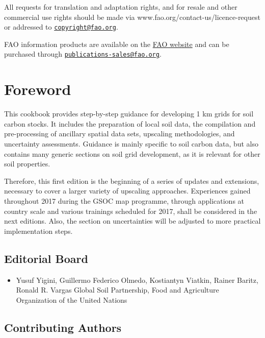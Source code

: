 \documentclass[10pt,b5paper,]{book}
\providecommand{\tightlist}{%
  \setlength{\itemsep}{0pt}\setlength{\parskip}{0pt}}
\theoremstyle{definition}
\theoremstyle{definition}
\theoremstyle{definition}
\theoremstyle{remark}
\begin{document}
All requests for translation and adaptation rights, and for resale and
other commercial use rights should be made via
www.fao.org/contact-us/licence-request or addressed to
\href{mailto:copyright@fao.org}{\nolinkurl{copyright@fao.org}}.

FAO information products are available on the
\href{www.fao.org/publications}{FAO website} and can be purchased
through
\href{mailto:publications-sales@fao.org}{\nolinkurl{publications-sales@fao.org}}.

\hypertarget{foreword}{%
\chapter*{Foreword}\label{foreword}}

This cookbook provides step-by-step guidance for developing 1 km grids
for soil carbon stocks. It includes the preparation of local soil data,
the compilation and pre-processing of ancillary spatial data sets,
upscaling methodologies, and uncertainty assessments. Guidance is mainly
specific to soil carbon data, but also contains many generic sections on
soil grid development, as it is relevant for other soil properties.

Therefore, this first edition is the beginning of a series of updates
and extensions, necessary to cover a larger variety of upscaling
approaches. Experiences gained throughout 2017 during the GSOC map
programme, through applications at country scale and various trainings
scheduled for 2017, shall be considered in the next editions. Also, the
section on uncertainties will be adjusted to more practical
implementation steps.

\clearpage

\hypertarget{editorial-board}{%
\section*{Editorial Board}\label{editorial-board}}

\begin{itemize}
\tightlist
\item
  Yusuf Yigini, Guillermo Federico Olmedo, Kostiantyn Viatkin, Rainer
  Baritz, Ronald R. Vargas Global Soil Partnership, Food and Agriculture
  Organization of the United Nations
\end{itemize}

\hypertarget{contributing-authors}{%
\section*{Contributing Authors}\label{contributing-authors}}
\end{document}
